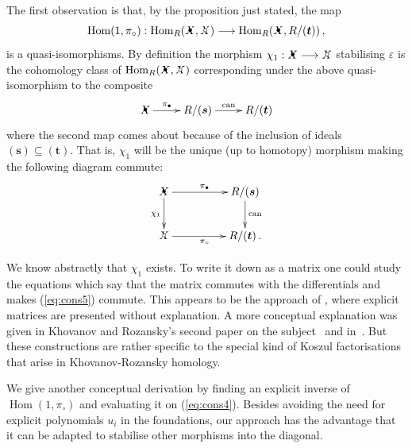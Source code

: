 \documentclass{compositio}
\theoremstyle{definition}
\numberwithin{equation}{section}
\def\can{\operatorname{can}}
\def\Hom{\operatorname{Hom}}
\begin{document}
The first observation is that, by the proposition just stated, the map
\[
\Hom(1,\pi_{\circ}): \Hom_R(\Xbul, \Xcirc) \lto \Hom_R(\Xbul, R/(\boldsymbol{t})) \,,
\]
is a quasi-isomorphisms. By definition the morphism $\chi_1: \Xbul \lto \Xcirc$ stabilising $\varepsilon$ is the cohomology class of $\Hom_R(\Xbul, \Xcirc)$ corresponding under the above quasi-isomorphism to the composite
\begin{equation}\label{eq:cons4}
\xymatrix{
\Xbul \ar[r]^-{\pi_{\bullet}} & R/(\boldsymbol{s}) \ar[r]^-{\can} & R/(\boldsymbol{t})
}
\end{equation}
where the second map comes about because of the inclusion of ideals $(\boldsymbol{s}) \subseteq (\boldsymbol{t})$. That is, $\chi_1$ will be the unique (up to homotopy) morphism making the following diagram commute:
\begin{equation}\label{eq:cons5}
\xymatrix@C+2pc{
\Xbul \ar[d]_{\chi_1} \ar[r]^{\pi_{\bullet}} & R/(\boldsymbol{s}) \ar[d]^{\can}\\
\Xcirc \ar[r]_{\pi_{\circ}} & R/(\boldsymbol{t}) \, . 
}
\end{equation}

We know abstractly that $\chi_1$ exists. To write it down as a matrix one could study the equations which say that the matrix commutes with the differentials and makes (\ref{eq:cons5}) commute. This appears to be the approach of \cite{kr0401268}, where explicit matrices are presented without explanation. A more conceptual explanation was given in Khovanov and Rozansky's second paper on the subject~\cite{kr0505056} and in~\cite{w0907.0695}. But these constructions are rather specific to the special kind of Koszul factorisations that arise in Khovanov-Rozansky homology. 

We give another conceptual derivation by finding an explicit inverse of $\Hom(1,\pi_{\circ})$ and evaluating it on (\ref{eq:cons4}). Besides avoiding the need for explicit polynomials $u_i$ in the foundations, our approach has the advantage that it can be adapted to stabilise other morphisms into the diagonal.
\end{document}
